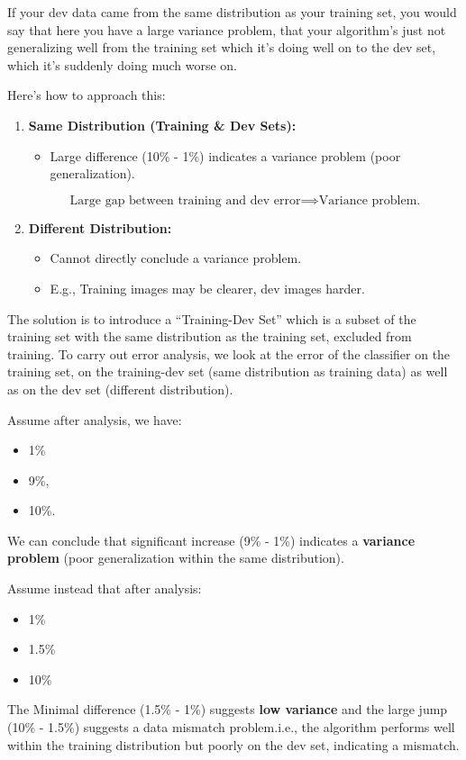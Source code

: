 \documentclass[letterpaper,12pt,notitlepage,twoside]{report}
\begin{document}
\begin{example}
If your dev data came from the same distribution as your training set, you would say that here you have a large variance problem, that your algorithm's just not generalizing well from the training set which it's doing well on to the dev set, which it's suddenly doing much worse on. 
\end{example}

Here's how to approach this:
\begin{enumerate}
\item \textbf{Same Distribution (Training \& Dev Sets):}
	\begin{itemize}
	    \item Large difference (10\% - 1\%) indicates a variance problem (poor generalization).
	\end{itemize}
     \[
     \text{Large gap between training and dev error} \implies \text{Variance problem.}
     \]
\item \textbf{Different Distribution:}
	\begin{itemize}
	    \item Cannot directly conclude a variance problem.
	    \item E.g., Training images may be clearer, dev images harder.
	\end{itemize}
\end{enumerate}

The solution is to introduce a ``Training-Dev Set'' which is a subset of the training set with the same distribution as the training set, excluded from training. To carry out error analysis, we look at the error of the classifier on the training set, on the training-dev set (same distribution as training data) as well as on the dev set (different distribution).

Assume after analysis, we have:
\begin{itemize}[nosep]
\item {} 1\%
\item {} 9\%,
\item {} 10\%. 
\end{itemize}

We can conclude that significant increase (9\% - 1\%) indicates a \textbf{variance problem} (poor generalization within the same distribution).

Assume instead that after analysis:
\begin{itemize}[nosep]
\item {} 1\%
\item {} 1.5\%
\item {} 10\%
\end{itemize}
The Minimal difference (1.5\% - 1\%) suggests \textbf{low variance} and the large jump (10\% - 1.5\%) suggests a data mismatch problem.i.e., the algorithm performs well within the training distribution but poorly on the dev set, indicating a mismatch.
\end{document}
